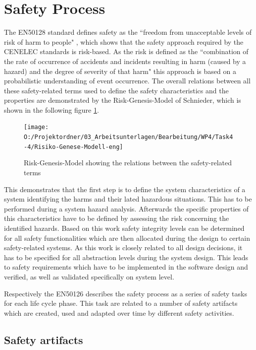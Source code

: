 \documentclass{template/openetcs_article}
\begin{document}

\section{Safety Process}

The EN50128 standard defines safety as the ``freedom from unacceptable levels of risk of harm to people" \cite{EN50128}, which shows that the safety approach required by the CENELEC standards is risk-based. As the risk is defined as the ``combination of the rate of occurrence of accidents and incidents resulting in harm (caused by a hazard) and the degree of severity  of that harm" this approach is based on a probabilistic understanding of event occurrence. The overall relations between all these safety-related terms used to define the safety characteristics and the properties are demonstrated by the Risk-Genesis-Model of Schnieder, which is shown in the following figure \ref{fig:Risiko-Genese-Modell-eng}.

\begin{figure}[h]
\centering
\texttt{[image: O:/Projektordner/03\_Arbeitsunterlagen/Bearbeitung/WP4/Task4-4/Risiko-Genese-Modell-eng]}
\caption{Risk-Genesis-Model showing the relations between the safety-related terms \cite{Schnieder.2010}}
\label{fig:Risiko-Genese-Modell-eng}
\end{figure}

This demonstrates that the first step is to define the system characteristics of a system identifying the harms and their lated hazardous situations. This has to be performed during a system hazard analysis. Afterwards the specific properties of this characteristics have to be defined by assessing the risk concerning the identified hazards. Based on this work safety integrity levels can be determined for all safety functionalities which are then allocated during the design to certain safety-related systems. As this work is closely related to all design decisions, it has to be specified for all abstraction levels during the system design. This leads to safety requirements which have to be implemented in the software design and verified, as well as validated specifically on system level. 

Respectively the EN50126 describes the safety process as a series of safety tasks for each life cycle phase. This task are related to a number of safety artifacts which are created, used and adapted over time by different safety activities.

\subsection{Safety artifacts}
\end{document}
